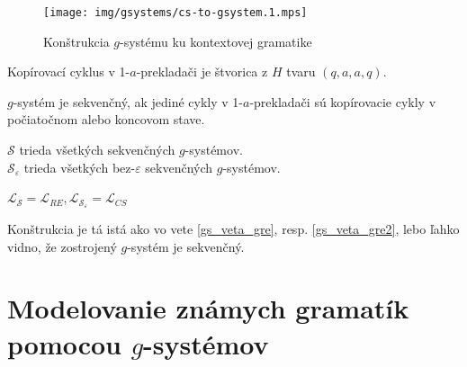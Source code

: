 \begin{figure}
  \centering
  \texttt{[image: img/gsystems/cs-to-gsystem.1.mps]}
  \caption{Konštrukcia $g$-systému ku kontextovej gramatike}
  \label{fig:cs-to-gsystem}
\end{figure}

\begin{definicia}
  Kopírovací cyklus v 1-$a$-prekladači je štvorica z $H$ tvaru
  $(q,a,a,q)$.
\end{definicia}

\begin{definicia}
  $g$-systém je sekvenčný, ak jediné cykly v 1-$a$-prekladači sú
  kopírovacie cykly v počiatočnom alebo koncovom stave.
\end{definicia}

\begin{oznacenie}
  $\mathcal{S}$ trieda všetkých sekvenčných $g$-systémov.\\
  $\mathcal{S}_\varepsilon$ trieda všetkých bez-$\varepsilon$
  sekvenčných $g$-systémov.
\end{oznacenie}

\pagebreak

\begin{veta}\label{gs_veta_gsek}
  $\mathcal{L}_{\mathcal{S}}=\mathcal{L}_{RE},
  \mathcal{L}_{\mathcal{S}_\varepsilon}=\mathcal{L}_{CS}$
\end{veta}

\begin{dokaz}
  Konštrukcia je tá istá ako vo vete \ref{gs_veta_gre}, resp.
  \ref{gs_veta_gre2}, lebo ľahko vidno, že zostrojený $g$-systém je
  sekvenčný.
\end{dokaz}

\section{Modelovanie známych gramatík pomocou $g$-systémov}

